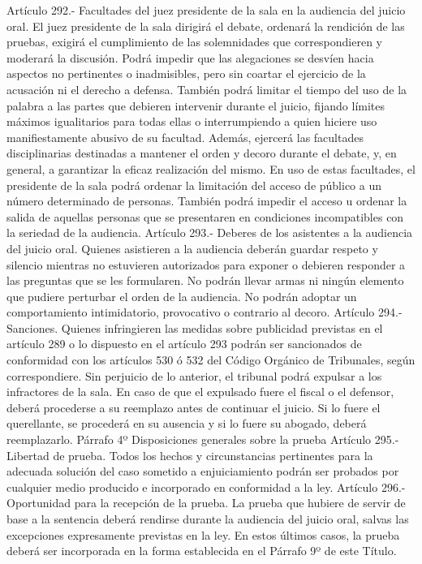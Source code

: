     Artículo 292.- Facultades del juez presidente de la sala en la audiencia del juicio oral. El juez presidente de la sala dirigirá el debate, ordenará la rendición de las pruebas, exigirá el cumplimiento de las solemnidades que correspondieren y moderará la discusión. Podrá impedir que las alegaciones se desvíen hacia aspectos no pertinentes o inadmisibles, pero sin coartar el ejercicio de la acusación ni el derecho a defensa.
    También podrá limitar el tiempo del uso de la palabra a las partes que debieren intervenir durante el juicio, fijando límites máximos igualitarios para todas ellas o interrumpiendo a quien hiciere uso manifiestamente abusivo de su facultad.
    Además, ejercerá las facultades disciplinarias destinadas a mantener el orden y decoro durante el debate, y, en general, a garantizar la eficaz realización del mismo.
    En uso de estas facultades, el presidente de la sala podrá ordenar la limitación del acceso de público a un número determinado de personas. También podrá impedir el acceso u ordenar la salida de aquellas personas que se presentaren en condiciones incompatibles con la seriedad de la audiencia.
    Artículo 293.- Deberes de los asistentes a la audiencia del juicio oral. Quienes asistieren a la audiencia deberán guardar respeto y silencio mientras no estuvieren autorizados para exponer o debieren responder a las preguntas que se les formularen. No podrán llevar armas ni ningún elemento que pudiere perturbar el orden de la audiencia. No podrán adoptar un comportamiento intimidatorio, provocativo o contrario al decoro.
    Artículo 294.- Sanciones. Quienes infringieren las medidas sobre publicidad previstas en el artículo 289 o lo dispuesto en el artículo 293 podrán ser sancionados de conformidad con los artículos 530 ó 532 del Código Orgánico de Tribunales, según correspondiere.
    Sin perjuicio de lo anterior, el tribunal podrá expulsar a los infractores de la sala.
    En caso de que el expulsado fuere el fiscal o el defensor, deberá procederse a su reemplazo antes de continuar el juicio. Si lo fuere el querellante, se procederá en su ausencia y si lo fuere su abogado, deberá reemplazarlo.
    Párrafo 4º Disposiciones generales sobre la prueba
    Artículo 295.- Libertad de prueba. Todos los hechos y circunstancias pertinentes para la adecuada solución del caso sometido a enjuiciamiento podrán ser probados por cualquier medio producido e incorporado en conformidad a la ley.
    Artículo 296.- Oportunidad para la recepción de la prueba. La prueba que hubiere de servir de base a la sentencia deberá rendirse durante la audiencia del juicio oral, salvas las excepciones expresamente previstas en la ley. En estos últimos casos, la prueba deberá ser incorporada en la forma establecida en el Párrafo 9º de este Título.
